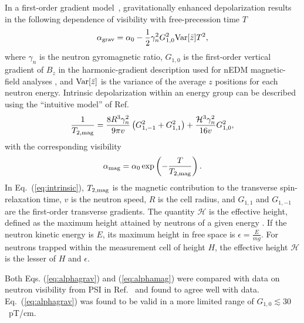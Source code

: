 \documentclass[preprint,12pt]{elsarticle}
\begin{document}
In a first-order gradient model~\cite{bib:Abel2019}, gravitationally
enhanced depolarization results in the following dependence of
visibility with free-precession time $T$
\begin{equation}
  \alpha_{\rm grav}=\alpha_0-\frac{1}{2}\gamma_n^2 G_{1,0}^2 {\rm Var}[\bar{z}] T^2,
  \label{eq:alphagrav}
\end{equation}
where $\gamma_n$ is the neutron gyromagnetic ratio, $G_{1,0}$ is the
first-order vertical gradient of $B_z$ in the harmonic-gradient
description used for nEDM magnetic-field analyses
\cite{bib:Abel2019,bib:Abel2022Mapping}, and ${\rm Var}[\bar{z}]$ is
the variance of the average $z$ positions for each neutron
energy. Intrinsic depolarization within an energy group can be
described using the ``intuitive model'' of
Ref.~\cite{bib:Harris2014GravitationalDepolarization,bib:Abel2019}
\begin{equation}
  \frac{1}{T_{2,\rm mag}}=
  \frac{8R^3\gamma_n^2}{9\pi v}\left(G_{1,-1}^2+G_{1,1}^2\right)
  +\frac{\mathcal{H}^3\gamma_n^2}{16v}G_{1,0}^2,
  \label{eq:intrinsic}
\end{equation}
with the corresponding visibility
\begin{equation}
  \alpha_{\rm mag}=\alpha_0\exp\left(-\frac{T}{T_{2,\rm mag}}\right).
  \label{eq:alphamag}
\end{equation}
In Eq.~(\ref{eq:intrinsic}), $T_{2,\rm mag}$ is the magnetic
contribution to the transverse spin-relaxation time, $v$ is the
neutron speed, $R$ is the cell radius, and $G_{1,1}$ and $G_{1,-1}$
are the first-order transverse gradients.  The quantity $\mathcal{H}$
is the effective height, defined as the maximum height attained by
neutrons of a given energy \cite{bib:afach-prd-92-052008-2015}.  If
the neutron kinetic energy is $E$, its maximum height in free space is
$\epsilon=\frac{E}{mg}$.  For neutrons trapped within the measurement
cell of height $H$, the effective height $\mathcal{H}$ is the lesser
of $H$ and $\epsilon$.

Both Eqs. (\ref{eq:alphagrav}) and (\ref{eq:alphamag}) were compared
with data on neutron visibility from PSI in Ref.~\cite{bib:Abel2019}
and found to agree well with data.  Eq.~(\ref{eq:alphagrav}) was found
to be valid in a more limited range of $G_{1,0}\lesssim 30$~pT/cm.
\end{document}
